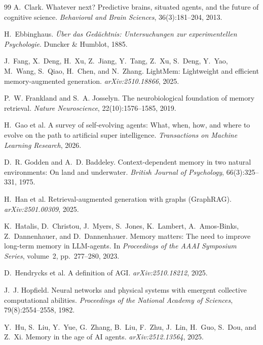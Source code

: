 \documentclass{article}
\theoremstyle{definition}\newtheorem{remark}{Remark}
\theoremstyle{plain}\newtheorem{proposition}{Proposition}
\begin{document}
\begin{thebibliography}{99}
 A.~Clark. Whatever next? Predictive brains,
situated agents, and the future of cognitive science. \emph{Behavioral and
Brain Sciences}, 36(3):181--204, 2013.

 H.~Ebbinghaus. \emph{\"Uber das
Ged\"achtnis: Untersuchungen zur experimentellen Psychologie}. Duncker \&
Humblot, 1885.

 J.~Fang, X.~Deng, H.~Xu,
Z.~Jiang, Y.~Tang, Z.~Xu, S.~Deng, Y.~Yao, M.~Wang, S.~Qiao, H.~Chen, and
N.~Zhang. LightMem: Lightweight and efficient memory-augmented generation.
\emph{arXiv:2510.18866}, 2025.

 P.~W. Frankland
and S.~A. Josselyn. The neurobiological foundation of memory retrieval.
\emph{Nature Neuroscience}, 22(10):1576--1585, 2019.

 H.~Gao et al. A survey of
self-evolving agents: What, when, how, and where to evolve on the path to
artificial super intelligence. \emph{Transactions on Machine Learning
Research}, 2026.

 D.~R. Godden and A.~D. Baddeley.
Context-dependent memory in two natural environments: On land and underwater.
\emph{British Journal of Psychology}, 66(3):325--331, 1975.

 H.~Han et al.
Retrieval-augmented generation with graphs (GraphRAG).
\emph{arXiv:2501.00309}, 2025.

 K.~Hatalis,
D.~Christou, J.~Myers, S.~Jones, K.~Lambert, A.~Amos-Binks, Z.~Dannenhauer, and
D.~Dannenhauer. Memory matters: The need to improve long-term memory in
LLM-agents. In \emph{Proceedings of the AAAI Symposium Series}, volume~2,
pp.\ 277--280, 2023.

 D.~Hendrycks et al. A
definition of AGI. \emph{arXiv:2510.18212}, 2025.

 J.~J. Hopfield. Neural networks and
physical systems with emergent collective computational abilities.
\emph{Proceedings of the National Academy of Sciences}, 79(8):2554--2558, 1982.

 Y.~Hu, S.~Liu, Y.~Yue, G.~Zhang,
B.~Liu, F.~Zhu, J.~Lin, H.~Guo, S.~Dou, and Z.~Xi. Memory in the age of AI
agents. \emph{arXiv:2512.13564}, 2025.


\end{thebibliography}
\end{document}
